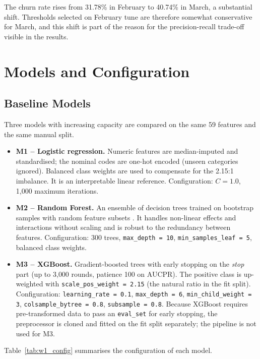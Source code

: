 \documentclass{article}
\begin{document}
The churn rate rises from 31.78\% in February to 40.74\% in March, a substantial shift. Thresholds selected on February tune are therefore somewhat conservative for March, and this shift is part of the reason for the precision-recall trade-off visible in the results.

\section{Models and Configuration}

\subsection{Baseline Models}

Three models with increasing capacity are compared on the same 59 features and the same manual split.

\begin{itemize}
    \item \textbf{M1 -- Logistic regression.} Numeric features are median-imputed and standardised; the nominal codes are one-hot encoded (unseen categories ignored). Balanced class weights are used to compensate for the 2.15:1 imbalance. It is an interpretable linear reference. Configuration: $C = 1.0$, 1{,}000 maximum iterations.
    \item \textbf{M2 -- Random Forest.} An ensemble of decision trees trained on bootstrap samples with random feature subsets \cite{breiman2001random}. It handles non-linear effects and interactions without scaling and is robust to the redundancy between features. Configuration: 300 trees, \texttt{max\_depth = 10}, \texttt{min\_samples\_leaf = 5}, balanced class weights.
    \item \textbf{M3 -- XGBoost.} Gradient-boosted trees \cite{chen2016xgboost} with early stopping on the \emph{stop} part (up to 3{,}000 rounds, patience 100 on AUCPR). The positive class is up-weighted with \texttt{scale\_pos\_weight = 2.15} (the natural ratio in the fit split). Configuration: \texttt{learning\_rate = 0.1}, \texttt{max\_depth = 6}, \texttt{min\_child\_weight = 3}, \texttt{colsample\_bytree = 0.8}, \texttt{subsample = 0.8}. Because XGBoost requires pre-transformed data to pass an \texttt{eval\_set} for early stopping, the preprocessor is cloned and fitted on the fit split separately; the pipeline is not used for M3.
\end{itemize}

Table~\ref{tab:w1_config} summarises the configuration of each model.
\end{document}
